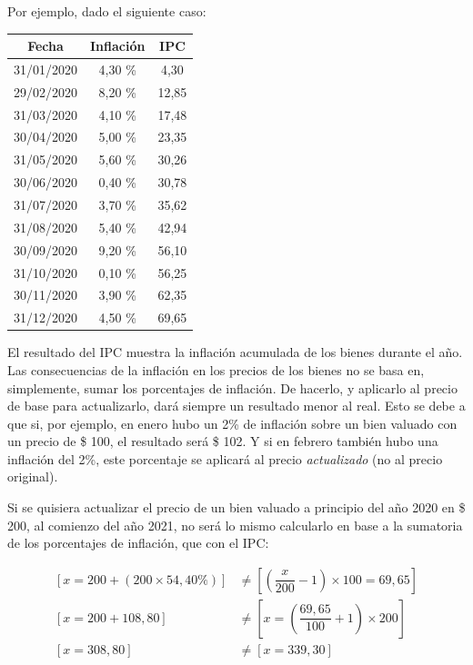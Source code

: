 \documentclass[12pt,a4paper,twoside]{book}
\begin{document}
Por ejemplo, dado el siguiente caso:

\begin{center}
\begin{longtable}{|c|c|c|}
\hline
\textbf{Fecha} & \textbf{Inflación} & \textbf{IPC} \\
\hline
31/01/2020 & 4,30 \% & 4,30 \\
\hline
29/02/2020 & 8,20 \% & 12,85 \\
\hline
31/03/2020 & 4,10 \% & 17,48 \\
\hline
30/04/2020 & 5,00 \% & 23,35 \\
\hline
31/05/2020 & 5,60 \% & 30,26 \\
\hline
30/06/2020 & 0,40 \% & 30,78 \\
\hline
31/07/2020 & 3,70 \% & 35,62 \\
\hline
31/08/2020 & 5,40 \% & 42,94 \\
\hline
30/09/2020 & 9,20 \% & 56,10 \\
\hline
31/10/2020 & 0,10 \% & 56,25 \\
\hline
30/11/2020 & 3,90 \% & 62,35 \\
\hline
31/12/2020 & 4,50 \% & 69,65 \\
\hline
\end{longtable}
\end{center}

El resultado del IPC muestra la inflación acumulada de los bienes durante el año. Las consecuencias de la inflación en los precios de los bienes no se basa en, simplemente, sumar los porcentajes de inflación. De hacerlo, y aplicarlo al precio de base para actualizarlo, dará siempre un resultado menor al real. Esto se debe a que si, por ejemplo, en enero hubo un 2\% de inflación sobre un bien valuado con un precio de \$ 100, el resultado será \$ 102. Y si en febrero también hubo una inflación del 2\%, este porcentaje se aplicará al precio \textit{actualizado} (no al precio original). 

Si se quisiera actualizar el precio de un bien valuado a principio del año 2020 en \$ 200, al comienzo del año 2021, no será lo mismo calcularlo en base a la sumatoria de los porcentajes de inflación, que con el IPC:

\begin{align*}
\left[ x = 200 + (200 \times 54,40 \% ) \right] &\neq \left[ \left( \dfrac{x}{200} -1 \right) \times 100 = 69,65 \right] \\
\left[ x = 200 + 108,80 \right] &\neq \left[ x = \left( \dfrac{69,65}{100} + 1 \right) \times 200 \right] \\
\left[ x = 308,80 \right] &\neq \left[ x = 339,30 \right] \\
\end{align*}
\end{document}
